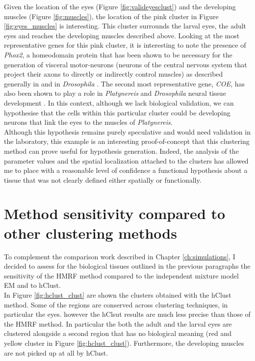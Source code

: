 	Given the location of the eyes (Figure \ref{fig:valideyesclust}) and the developing muscles (Figure \ref{fig:muscles}), the location of the pink cluster in Figure \ref{fig:eyes_muscles} is interesting. This cluster surrounds the larval eyes, the adult eyes and reaches the developing muscles described above. Looking at the most representative genes for this pink cluster, it is interesting to note the presence of {\it{Phox2}}, a homeodomain protein that has been shown to be necessary for the generation of visceral motor-neurons (neurons of the central nervous system that project their axons to directly or indirectly control muscles) as described generally in \citep{brunet02} and in \emph{Drosophila} \citep{briscoe99}. The second most representative gene, {\it{COE}}, has also been shown to play a role in \emph{Platynereis} and \emph{Drosophila} neural tissue development \citep{demilly11}. In this context, although we lack biological validation, we can hypothesise that the cells within this particular cluster could be developing neurons that link the eyes to the muscles of \emph{Platynereis}.\\
	
	 Although this hypothesis remains purely speculative and would need validation in the laboratory, this example is an interesting proof-of-concept that this clustering method can prove useful for hypothesis generation. Indeed, the analysis of the parameter values and the spatial localization attached to the clusters has allowed me to place with a reasonable level of confidence a functional hypothesis about a tissue that was not clearly defined either spatially or functionally. \\
	 
\section{Method sensitivity compared to other clustering methods}
	To complement the comparison work described in Chapter \ref{ch:simulations}, I decided to assess for the biological tissues outlined in the previous paragraphs the sensitivity of the HMRF method compared to the independent mixture model EM and to hClust.\\
	
	In Figure \ref{fig:hclust_clust} are shown the clusters obtained with the hClust method. Some of the regions are conserved across clustering techniques, in particular the eyes. however the hClsut results are much less precise than those of the HMRF method. In particular the both the adult and the larval eyes are clustered alongside a second region that has no biological meaning (red and yellow cluster in Figure \ref{fig:hclust_clust}). Furthermore, the developing muscles are not picked up at all by hClust.
	
